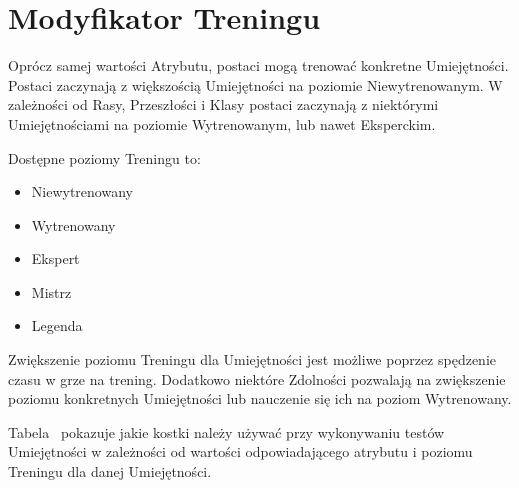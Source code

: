 \section{Modyfikator Treningu}

Oprócz samej wartości Atrybutu, postaci mogą trenować konkretne Umiejętności.
Postaci zaczynają z większością Umiejętności na poziomie Niewytrenowanym. W
zależności od Rasy, Przeszłości i Klasy postaci zaczynają z niektórymi
Umiejętnościami na poziomie Wytrenowanym, lub nawet Eksperckim.

Dostępne poziomy Treningu to:
\begin{itemize}
	\item Niewytrenowany
	\item Wytrenowany
	\item Ekspert
	\item Mistrz
	\item Legenda
\end{itemize}

Zwiększenie poziomu Treningu dla Umiejętności jest możliwe poprzez spędzenie
czasu w grze na trening. Dodatkowo niektóre Zdolności pozwalają na zwiększenie
poziomu konkretnych Umiejętności lub nauczenie się ich na poziom Wytrenowany.

Tabela~ pokazuje jakie kostki należy używać przy
wykonywaniu testów Umiejętności w zależności od wartości odpowiadającego
atrybutu i poziomu Treningu dla danej Umiejętności.

\begin{table}[h]
\centering
{}
\caption{Zestawienie Kości Umiejętności w zależności od wartości Atrybutu i poziomu Treningu w danej Umiejętności}
\label{tab:skill-dice}
\end{table}
